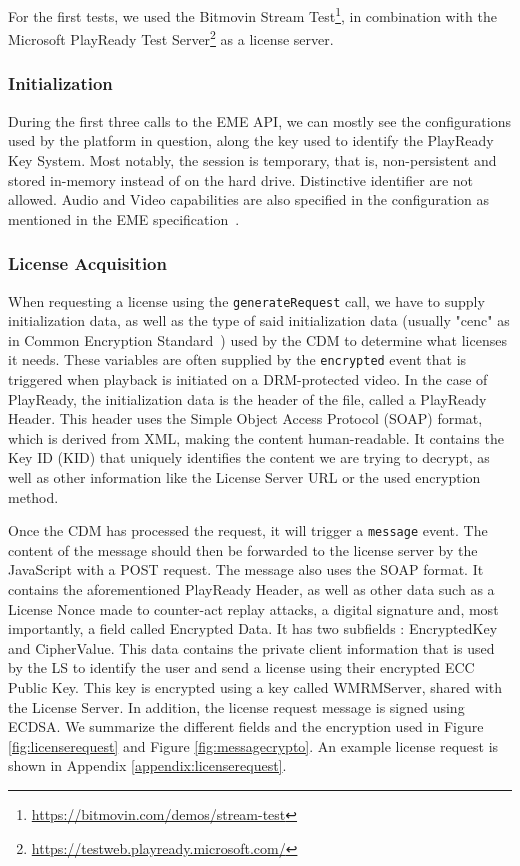 \documentclass[11pt, a4paper]{IEEEtran}
\begin{document}
For the first tests, we used the Bitmovin Stream Test\footnote{\url{https://bitmovin.com/demos/stream-test}}, in combination with the Microsoft PlayReady Test Server\footnote{\url{https://testweb.playready.microsoft.com/}} as a license server.

\subsubsection{Initialization}

During the first three calls to the EME API, we can mostly see the configurations used by the platform in question, along the key used to identify the PlayReady Key System. Most notably, the session is temporary, that is, non-persistent and stored in-memory instead of on the hard drive. Distinctive identifier are not allowed. Audio and Video capabilities are also specified in the configuration as mentioned in the EME specification~\cite{EME}. 

\subsubsection{License Acquisition}

When requesting a license using the \texttt{generateRequest} call, we have to supply initialization data, as well as the type of said initialization data (usually "cenc" as in Common Encryption Standard~\cite{cenc}) used by the CDM to determine what licenses it needs. These variables are often supplied by the \texttt{encrypted} event that is triggered when playback is initiated on a DRM-protected video. In the case of PlayReady, the initialization data is the header of the file, called a PlayReady Header. This header uses the Simple Object Access Protocol (SOAP) format, which is derived from XML, making the content human-readable. It contains the Key ID (KID) that uniquely identifies the content we are trying to decrypt, as well as other information like the License Server URL or the used encryption method.

Once the CDM has processed the request, it will trigger a \texttt{message} event. The content of the message should then be forwarded to the license server by the JavaScript with a POST request. The message also uses the SOAP format. It contains the aforementioned PlayReady Header, as well as other data such as a License Nonce made to counter-act replay attacks, a digital signature and, most importantly, a field called Encrypted Data. It has two subfields : EncryptedKey and CipherValue. This data contains the private client information that is used by the LS to identify the user and send a license using their encrypted ECC Public Key. This key is encrypted using a key called WMRMServer, shared with the License Server. In addition, the license request message is signed using ECDSA. We summarize the different fields and the encryption used in Figure \ref{fig:licenserequest} and Figure \ref{fig:messagecrypto}. An example license request is shown in Appendix \ref{appendix:licenserequest}.
\end{document}
